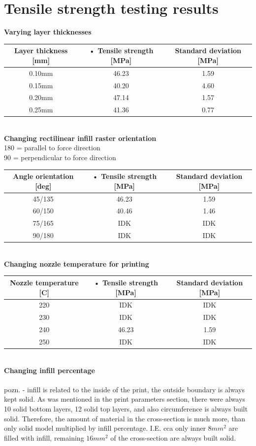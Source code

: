 \documentclass[a4paper, twoside, 11pt]{report}
\begin{document}
\section{Tensile strength testing results}
\textbf{Varying layer thicknesses}\\
\begin{tabular}{|c|c|c|}
\hline 
Layer thickness [mm] & • Tensile strength [MPa] & Standard deviation [MPa]\\ 
\hline 
0.10mm & 46.23 & 1.59\\ 
\hline 
0.15mm & 40.20 & 4.60\\ 
\hline 
0.20mm & 47.14 & 1.57\\ 
\hline 
0.25mm & 41.36 & 0.77\\ 
\hline 
\end{tabular}
\\[20pt]
%
\textbf{Changing rectilinear infill raster orientation}\\
180 = parallel to force direction\\
90 = perpendicular to force direction\\
\begin{tabular}{|c|c|c|}
\hline 
Angle orientation [deg] & • Tensile strength [MPa] & Standard deviation [MPa]\\ 
\hline 
45/135 & 46.23 & 1.59\\ 
\hline 
60/150 & 40.46 & 1.46\\ 
\hline 
75/165 & IDK & IDK\\ 
\hline 
90/180 & IDK & IDK\\ 
\hline 
\end{tabular}
\\[20pt]
%
\textbf{Changing nozzle temperature for printing}\\
\begin{tabular}{|c|c|c|}
\hline 
Nozzle temperature [C] & • Tensile strength [MPa] & Standard deviation [MPa]\\ 
\hline 
220 & IDK & IDK\\ 
\hline 
230 & IDK & IDK\\ 
\hline 
240 & 46.23 & 1.59\\ 
\hline 
250 & IDK & IDK\\ 
\hline 
\end{tabular}
\\[20pt]
%
\textbf{Changing infill percentage}\\
\\pozn. - infill is related to the inside of the print, the outside boundary is always kept solid. As was mentioned in the print parameters section, there were always 10 solid bottom layers, 12 solid top layers, and also circumference is always built solid. Therefore, the amount of material in the cross-section is much more, than only solid model multiplied by infill percentage. I.E. cca only inner $8mm^2$ are filled with infill, remaining $16mm^2$ of the cross-section are always built solid.\\
\end{document}
